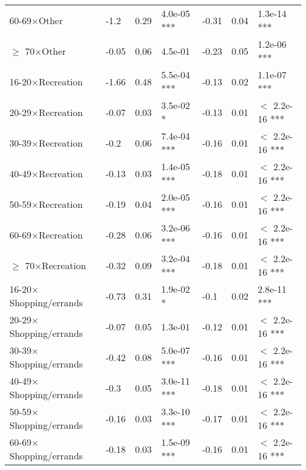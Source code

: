 \documentclass{article}\usepackage[utf8]{inputenc}
\begin{document}
\begin{longtable}[t]{lllllll}
\hspace{1em}60-69$\times$Other & -1.2 & 0.29 & 4.0e-05 *** & -0.31 & 0.04 & 1.3e-14 ***\\
\hspace{1em}$\geq$ 70$\times$Other & -0.05 & 0.06 & 4.5e-01 & -0.23 & 0.05 & 1.2e-06 ***\\
\hspace{1em}16-20$\times$Recreation & -1.66 & 0.48 & 5.5e-04 *** & -0.13 & 0.02 & 1.1e-07 ***\\
\hspace{1em}20-29$\times$Recreation & -0.07 & 0.03 & 3.5e-02 * & -0.13 & 0.01 & $<$ 2.2e-16 ***\\
\hspace{1em}30-39$\times$Recreation & -0.2 & 0.06 & 7.4e-04 *** & -0.16 & 0.01 & $<$ 2.2e-16 ***\\
\hspace{1em}40-49$\times$Recreation & -0.13 & 0.03 & 1.4e-05 *** & -0.18 & 0.01 & $<$ 2.2e-16 ***\\
\hspace{1em}50-59$\times$Recreation & -0.19 & 0.04 & 2.0e-05 *** & -0.16 & 0.01 & $<$ 2.2e-16 ***\\
\hspace{1em}60-69$\times$Recreation & -0.28 & 0.06 & 3.2e-06 *** & -0.16 & 0.01 & $<$ 2.2e-16 ***\\
\hspace{1em}$\geq$ 70$\times$Recreation & -0.32 & 0.09 & 3.2e-04 *** & -0.18 & 0.01 & $<$ 2.2e-16 ***\\
\hspace{1em}16-20$\times$Shopping/errands & -0.73 & 0.31 & 1.9e-02 * & -0.1 & 0.02 & 2.8e-11 ***\\
\hspace{1em}20-29$\times$Shopping/errands & -0.07 & 0.05 & 1.3e-01 & -0.12 & 0.01 & $<$ 2.2e-16 ***\\
\hspace{1em}30-39$\times$Shopping/errands & -0.42 & 0.08 & 5.0e-07 *** & -0.16 & 0.01 & $<$ 2.2e-16 ***\\
\hspace{1em}40-49$\times$Shopping/errands & -0.3 & 0.05 & 3.0e-11 *** & -0.18 & 0.01 & $<$ 2.2e-16 ***\\
\hspace{1em}50-59$\times$Shopping/errands & -0.16 & 0.03 & 3.3e-10 *** & -0.17 & 0.01 & $<$ 2.2e-16 ***\\
\hspace{1em}60-69$\times$Shopping/errands & -0.18 & 0.03 & 1.5e-09 *** & -0.16 & 0.01 & $<$ 2.2e-16 ***\\

\end{longtable}
\end{document}

